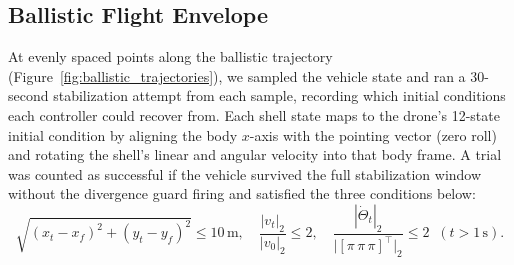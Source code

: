 \documentclass[conf]{new-aiaa}
\begin{document}
\subsection{Ballistic Flight Envelope}
\label{sec:ballistic-envelope}
At evenly spaced points along the ballistic trajectory (Figure~\ref{fig:ballistic_trajectories}), we sampled the vehicle state and ran a 30-second stabilization attempt from each sample, recording which initial conditions each controller could recover from. Each shell state maps to the drone's 12-state initial condition by aligning the body $x$-axis with the pointing vector (zero roll) and rotating the shell's linear and angular velocity into that body frame. A trial was counted as successful if the vehicle survived the full stabilization window without the divergence guard firing and satisfied the three conditions below:
\begin{equation}
\label{eq:ballistic-success}
\sqrt{(x_t-x_f)^2 + (y_t-y_f)^2} \le 10\,\text{m}, \quad
\frac{|v_t|_2}{|v_0|_2} \le 2, \quad
\frac{|\dot\Theta_t|_2}{\bigl|[\pi\,\pi\,\pi]^{\top}\bigr|_2} \le 2 \;\; (t > 1\,\text{s}).
\end{equation}
\end{document}
